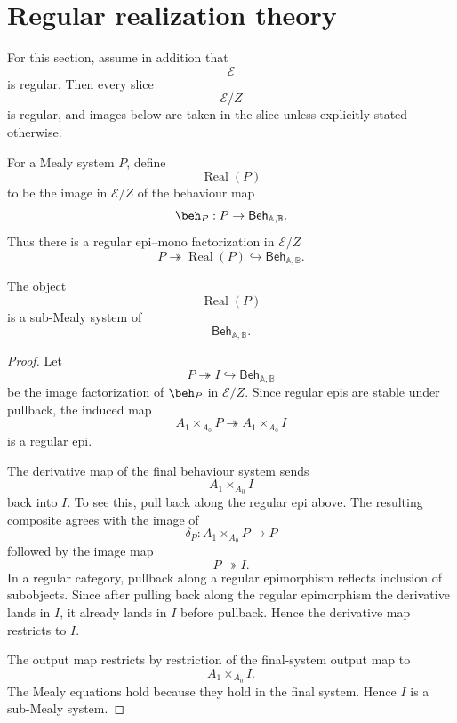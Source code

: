 \section{Regular realization theory}
\label{sec:regular-realization-theory}

For this section, assume in addition that
\[
\mathcal E
\]
is regular. Then every slice
\[
\mathcal E/Z
\]
is regular, and images below are taken in the slice unless explicitly stated
otherwise.

\begin{definition}
\label{def:realized-behaviour-object}
For a Mealy system \(P\), define
\[
\operatorname{Real}(P)
\]
to be the image in \(\mathcal E/Z\) of the behaviour map
\[
\beh_P:P\to\mathsf{Beh}_{\mathbb A,\mathbb B}.
\]
Thus there is a regular epi--mono factorization in \(\mathcal E/Z\)
\[
P\twoheadrightarrow
\operatorname{Real}(P)
\hookrightarrow
\mathsf{Beh}_{\mathbb A,\mathbb B}.
\]
\end{definition}

\begin{proposition}
\label{prop:realized-behaviour-submealy}
The object
\[
\operatorname{Real}(P)
\]
is a sub-Mealy system of
\[
\mathsf{Beh}_{\mathbb A,\mathbb B}.
\]
\end{proposition}

\begin{proof}
Let
\[
P\twoheadrightarrow I\hookrightarrow\mathsf{Beh}_{\mathbb A,\mathbb B}
\]
be the image factorization of \(\beh_P\) in \(\mathcal E/Z\). Since regular
epis are stable under pullback, the induced map
\[
A_1\times_{A_0}P
\twoheadrightarrow
A_1\times_{A_0}I
\]
is a regular epi.

The derivative map of the final behaviour system sends
\[
A_1\times_{A_0}I
\]
back into \(I\). To see this, pull back along the regular epi above. The
resulting composite agrees with the image of
\[
\delta_P:
A_1\times_{A_0}P\to P
\]
followed by the image map
\[
P\twoheadrightarrow I.
\]
In a regular category, pullback along a regular epimorphism reflects inclusion
of subobjects. Since after pulling back along the regular epimorphism the
derivative lands in \(I\), it already lands in \(I\) before pullback. Hence
the derivative map restricts to \(I\).

The output map restricts by restriction of the final-system output map to
\[
A_1\times_{A_0}I.
\]
The Mealy equations hold because they hold in the final system. Hence \(I\) is
a sub-Mealy system.
\end{proof}

